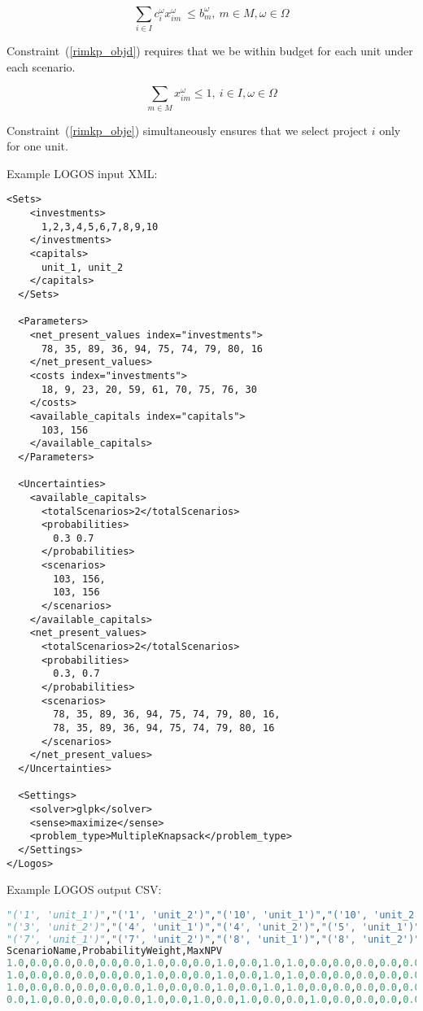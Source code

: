 \begin{equation}\label{rimkp_objd}
 \sum _{i \in I}^{} c_{i}^{ \omega }x_{im}^{ \omega }~  \leq  b_{m}^{ \omega },~ m \in M,  \omega  \in  \Omega
\end{equation}

Constraint~(\ref{rimkp_objd}) requires that we be within budget
for each unit under each scenario.

\begin{equation}\label{rimkp_obje}
\sum_{m\in M} x_{im}^{ \omega } \leq 1,~ i \in I, \omega  \in  \Omega
\end{equation}

Constraint~(\ref{rimkp_obje}) simultaneously ensures that we select project $i$
only for one unit.

Example LOGOS input XML:
\begin{lstlisting}[style=XML]
  <Sets>
    <investments>
      1,2,3,4,5,6,7,8,9,10
    </investments>
    <capitals>
      unit_1, unit_2
    </capitals>
  </Sets>

  <Parameters>
    <net_present_values index="investments">
      78, 35, 89, 36, 94, 75, 74, 79, 80, 16
    </net_present_values>
    <costs index="investments">
      18, 9, 23, 20, 59, 61, 70, 75, 76, 30
    </costs>
    <available_capitals index="capitals">
      103, 156
    </available_capitals>
  </Parameters>

  <Uncertainties>
    <available_capitals>
      <totalScenarios>2</totalScenarios>
      <probabilities>
        0.3 0.7
      </probabilities>
      <scenarios>
        103, 156,
        103, 156
      </scenarios>
    </available_capitals>
    <net_present_values>
      <totalScenarios>2</totalScenarios>
      <probabilities>
        0.3, 0.7
      </probabilities>
      <scenarios>
        78, 35, 89, 36, 94, 75, 74, 79, 80, 16,
        78, 35, 89, 36, 94, 75, 74, 79, 80, 16
      </scenarios>
    </net_present_values>
  </Uncertainties>

  <Settings>
    <solver>glpk</solver>
    <sense>maximize</sense>
    <problem_type>MultipleKnapsack</problem_type>
  </Settings>
</Logos>
\end{lstlisting}

Example LOGOS output CSV:
\begin{lstlisting}[basicstyle=\tiny,language=python]
"('1', 'unit_1')","('1', 'unit_2')","('10', 'unit_1')","('10', 'unit_2')","('2', 'unit_1')","('2', 'unit_2')","('3', 'unit_1')",
"('3', 'unit_2')","('4', 'unit_1')","('4', 'unit_2')","('5', 'unit_1')","('5', 'unit_2')","('6', 'unit_1')","('6', 'unit_2')",
"('7', 'unit_1')","('7', 'unit_2')","('8', 'unit_1')","('8', 'unit_2')","('9', 'unit_1')","('9', 'unit_2')",
ScenarioName,ProbabilityWeight,MaxNPV
1.0,0.0,0.0,0.0,0.0,0.0,1.0,0.0,0.0,1.0,0.0,1.0,1.0,0.0,0.0,0.0,0.0,0.0,0.0,1.0,scenario_1,0.09,452.0
1.0,0.0,0.0,0.0,0.0,0.0,1.0,0.0,0.0,1.0,0.0,1.0,1.0,0.0,0.0,0.0,0.0,0.0,0.0,1.0,scenario_2,0.21,452.0
1.0,0.0,0.0,0.0,0.0,0.0,1.0,0.0,0.0,1.0,0.0,1.0,1.0,0.0,0.0,0.0,0.0,0.0,0.0,1.0,scenario_3,0.21,452.0
0.0,1.0,0.0,0.0,0.0,0.0,1.0,0.0,1.0,0.0,1.0,0.0,0.0,1.0,0.0,0.0,0.0,0.0,0.0,1.0,scenario_4,0.49,452.0
\end{lstlisting}

